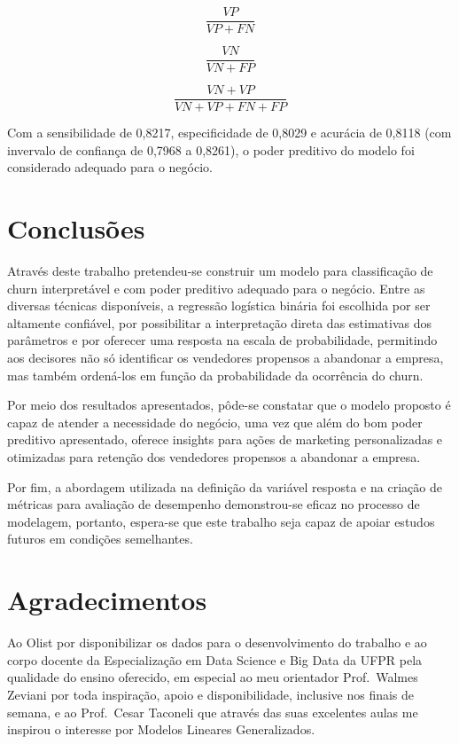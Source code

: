\documentclass[twocolumn]{rbef}
\newcommand{\1}{\mathbbm{1}}
\begin{document}
\begin{equation}
\dfrac{VP}{VP+FN}\label{eq:sensitivity}
\end{equation}

\begin{equation}
\dfrac{VN}{VN+FP}\label{eq:specificity}
\end{equation}

\begin{equation}
\dfrac{VN+VP}{VN+VP+FN+FP}\label{eq:accuracy}
\end{equation}

Com a sensibilidade de 0,8217, especificidade de 0,8029 e acurácia de 0,8118 (com invervalo de confiança de 0,7968 a 0,8261), o poder preditivo do modelo foi considerado adequado para o negócio.

\hypertarget{conclusuxf5es}{%
\section{Conclusões}\label{conclusuxf5es}}

Através deste trabalho pretendeu-se construir um modelo para classificação de churn interpretável e com poder preditivo adequado para o negócio. Entre as diversas técnicas disponíveis, a regressão logística binária foi escolhida por ser altamente confiável, por possibilitar a interpretação direta das estimativas dos parâmetros e por oferecer uma resposta na escala de probabilidade, permitindo aos decisores não só identificar os vendedores propensos a abandonar a empresa, mas também ordená-los em função da probabilidade da ocorrência do churn.

Por meio dos resultados apresentados, pôde-se constatar que o modelo proposto é capaz de atender a necessidade do negócio, uma vez que além do bom poder preditivo apresentado, oferece insights para ações de marketing personalizadas e otimizadas para retenção dos vendedores propensos a abandonar a empresa.

Por fim, a abordagem utilizada na definição da variável resposta e na criação de métricas para avaliação de desempenho demonstrou-se eficaz no processo de modelagem, portanto, espera-se que este trabalho seja capaz de apoiar estudos futuros em condições semelhantes.

\hypertarget{agradecimentos}{%
\section{Agradecimentos}\label{agradecimentos}}

Ao Olist por disponibilizar os dados para o desenvolvimento do trabalho e ao corpo docente da Especialização em Data Science e Big Data da UFPR pela qualidade do ensino oferecido, em especial ao meu orientador Prof.~Walmes Zeviani por toda inspiração, apoio e disponibilidade, inclusive nos finais de semana, e ao Prof.~Cesar Taconeli que através das suas excelentes aulas me inspirou o interesse por Modelos Lineares Generalizados.



\end{document}

